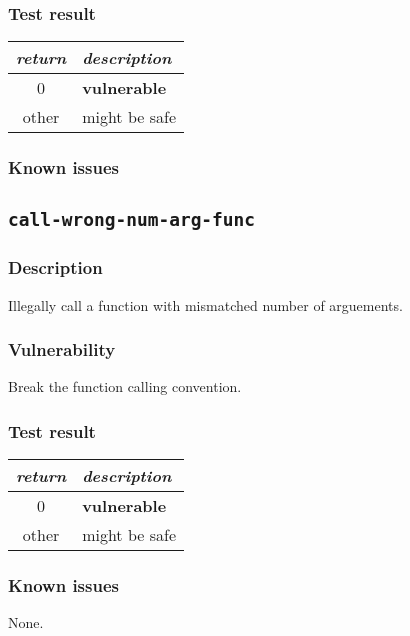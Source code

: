 \documentclass[a4paper]{book}
\begin{document}
\subsubsection{Test result}
\begin{tabular}{cl}
  \toprule
  \emph{return}  & \emph{description} \\
  \midrule
  0              & \textbf{vulnerable} \\
  other          & might be safe \\
  \bottomrule
\end{tabular}
  
\subsubsection{Known issues}

\newpage
\subsection{\texttt{call-wrong-num-arg-func}}\label{test-call-wrong-num-arg-func}

\subsubsection{Description}
Illegally call a function with mismatched number of arguements.

\subsubsection{Vulnerability}
Break the function calling convention.

\subsubsection{Test result}
\begin{tabular}{cl}
  \toprule
  \emph{return}  & \emph{description} \\
  \midrule
  0              & \textbf{vulnerable} \\
  other          & might be safe \\
  \bottomrule
\end{tabular}

\subsubsection{Known issues}
None.

\newpage
\end{document}
